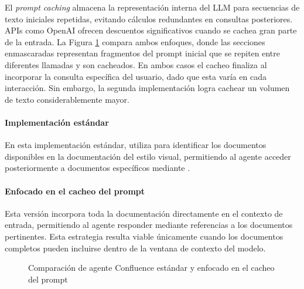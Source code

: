 El \textit{prompt caching} almacena la representación interna del LLM para secuencias de texto iniciales repetidas, evitando cálculos redundantes en consultas posteriores. APIs como OpenAI ofrecen descuentos significativos cuando se cachea gran parte de la entrada. La Figura \ref{fig:caching} compara ambos enfoques, donde las secciones enmascaradas representan fragmentos del prompt inicial que se repiten entre diferentes llamadas y son cacheados. En ambos casos el cacheo finaliza al incorporar la consulta específica del usuario, dado que esta varía en cada interacción. Sin embargo, la segunda implementación logra cachear un volumen de texto considerablemente mayor.
\paragraph{Implementación estándar}
En esta implementación estándar,  utiliza  para identificar los documentos disponibles en la documentación del estilo visual, permitiendo al agente acceder posteriormente a documentos específicos mediante .
\paragraph{Enfocado en el cacheo del prompt}
Esta versión incorpora toda la documentación directamente en el contexto de entrada, permitiendo al agente responder mediante referencias a los documentos pertinentes. Esta estrategia resulta viable únicamente cuando los documentos completos pueden incluirse dentro de la ventana de contexto del modelo.

\begin{figure}[h]
  \centering
  \caption{Comparación de agente Confluence estándar y enfocado en el cacheo del prompt}
  \label{fig:caching}
\end{figure}

